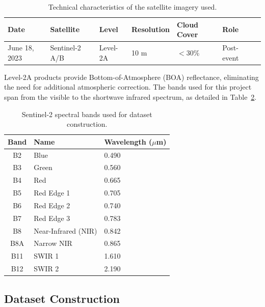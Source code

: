 \documentclass{article}
\begin{document}
\begin{table}[h]
    \centering
    \caption{Technical characteristics of the satellite imagery used.}
    \label{tab:imagery_metadata}
    \begin{tabular}{lllllll}
        \hline
        \textbf{Date} & \textbf{Satellite} & \textbf{Level} &
        \textbf{Resolution} & \textbf{Cloud Cover} & \textbf{Role} \\
        \hline
        June 18, 2023 & Sentinel-2 A/B & Level-2A & 10 m & $<$30\% & Post-event \\
        \hline
    \end{tabular}
\end{table}

Level-2A products provide Bottom-of-Atmosphere (BOA) reflectance, eliminating the
need for additional atmospheric correction. The bands used for this project span
from the visible to the shortwave infrared spectrum, as detailed in
Table~\ref{tab:bands}.

\begin{table}[h]
    \centering
    \caption{Sentinel-2 spectral bands used for dataset construction.}
    \label{tab:bands}
    \begin{tabular}{cll}
        \hline
        \textbf{Band} & \textbf{Name} & \textbf{Wavelength ($\mu$m)} \\
        \hline
        B2  & Blue                   & 0.490 \\
        B3  & Green                  & 0.560 \\
        B4  & Red                    & 0.665 \\
        B5  & Red Edge 1             & 0.705 \\
        B6  & Red Edge 2             & 0.740 \\
        B7  & Red Edge 3             & 0.783 \\
        B8  & Near-Infrared (NIR)    & 0.842 \\
        B8A & Narrow NIR             & 0.865 \\
        B11 & SWIR 1                 & 1.610 \\
        B12 & SWIR 2                 & 2.190 \\
        \hline
    \end{tabular}
\end{table}

\subsection{Dataset Construction}
\end{document}
